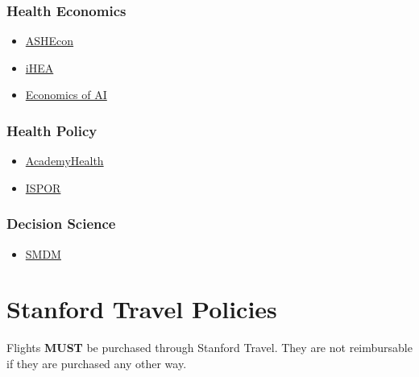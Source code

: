 \documentclass[
]{book}
\providecommand{\tightlist}{%
  \setlength{\itemsep}{0pt}\setlength{\parskip}{0pt}}
\begin{document}
\hypertarget{health-economics}{%
\subsubsection*{Health Economics}\label{health-economics}}

\begin{itemize}
\tightlist
\item
  \href{https://www.ashecon.org/conferences/}{ASHEcon}
\item
  \href{https://healtheconomics.org/}{iHEA}
\item
  \href{https://www.economicsofai.com/nber-conference-toronto-2023}{Economics of AI}
\end{itemize}

\hypertarget{health-policy}{%
\subsubsection*{Health Policy}\label{health-policy}}

\begin{itemize}
\tightlist
\item
  \href{https://academyhealth.org/events/2023-06/2023-annual-research-meeting}{AcademyHealth}
\item
  \href{https://www.ispor.org/conferences-education/conferences}{ISPOR}
\end{itemize}

\hypertarget{decision-science}{%
\subsubsection*{Decision Science}\label{decision-science}}

\begin{itemize}
\tightlist
\item
  \href{https://smdm.org/meetings}{SMDM}
\end{itemize}

\hypertarget{stanford-travel-policies}{%
\section{Stanford Travel Policies}\label{stanford-travel-policies}}

Flights \textbf{MUST} be purchased through Stanford Travel. They are not reimbursable if they are purchased any other way.
\end{document}
